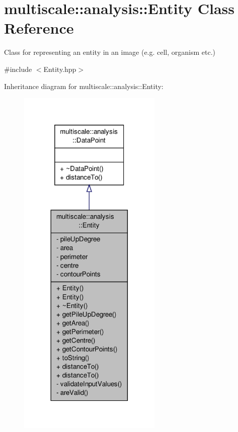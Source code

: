 \hypertarget{classmultiscale_1_1analysis_1_1Entity}{\section{multiscale\-:\-:analysis\-:\-:Entity Class Reference}
\label{classmultiscale_1_1analysis_1_1Entity}
}


Class for representing an entity in an image (e.\-g. cell, organism etc.)  




{\ttfamily \#include $<$Entity.\-hpp$>$}



Inheritance diagram for multiscale\-:\-:analysis\-:\-:Entity\-:\nopagebreak
\begin{figure}[H]
\begin{center}
\leavevmode
\includegraphics[width=194pt]{classmultiscale_1_1analysis_1_1Entity__inherit__graph}
\end{center}
\end{figure}


